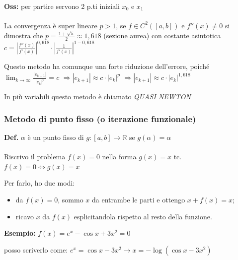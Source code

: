 \documentclass[a4paper, 11pt]{article}
\begin{document}
        \paragraph{}
        \textbf{Oss: }{per partire servono 2 p.ti iniziali $x_0$ e $x_1$}
        
        \paragraph{}
        La convergenza è super lineare $p > 1$, se $f \in C^2([a, b])$ e $f''(x) \neq 0$ si dimostra che $p = \frac{1 + \sqrt{5}}{2} \approx 1,618$ (sezione aurea) con costante asintotica $c = \left| \frac{f''(x)}{f'(x)} \right|^{0,618} \cdot \left| \frac{1}{f'(x)} \right|^{1 - 0,618}$

       
        Questo metodo ha comunque una forte riduzione dell'errore, poiché $\lim_{k \to \infty} \frac{|e_{k+1}|}{|e_k|^p} = c$ \quad $\Rightarrow |e_{k+1}| \approx c \cdot |e_k|^p$ \quad $\Rightarrow |e_{k+1}| \approx c \cdot |e_k|^{1,618}$
        
        In più variabili questo metodo è chiamato \textit{QUASI NEWTON}

        \subsubsection{Metodo di punto fisso (o iterazione funzionale)}

        \textbf{Def.} $\alpha$ è un punto fisso di $g: [a, b] \rightarrow \mathbb{R}$ se $g(\alpha) = \alpha$

        \paragraph{}
        Riscrivo il problema $f(x) = 0$ nella forma $g(x) = x$ tc. $f(x) = 0 \iff g(x) = x$

        Per farlo, ho due modi:

        \begin{itemize}
            \item da $f(x) = 0$, sommo $x$ da entrambe le parti e ottengo $x + f(x) = x$;
            \item ricavo $x$ da $f(x)$ esplicitandola rispetto al resto della funzione.
        \end{itemize}

        \textbf{Esempio: } $f(x) = e^x - \cos x + 3x^2 = 0$ 
        
        posso scriverlo come: $e^x = \cos x - 3x^2 \rightarrow x = -\log(\cos x - 3x^2)$
\end{document}
